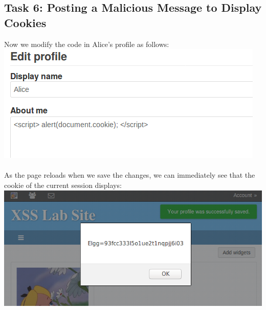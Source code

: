 \documentclass[a4paper]{article}
\begin{document}
\subsection{Task 6: Posting a Malicious Message to Display Cookies}
Now we modify the code in Alice's profile as follows:\\
\includegraphics[scale=0.7]{2/3.png}\\\\
As the page reloads when we save the changes, we can immediately see that the cookie of the current session displays:\\
\includegraphics[scale=0.7]{2/4.png}\\\\
\end{document}
